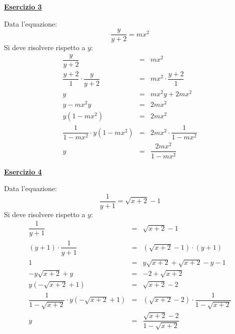 \documentclass[a4paper]{article}
\newcommand{\example}[1]{\textcolor{Green4}{\textbf{#1}}}
\begin{document}
	\begin{flushleft}
		\example{\underline{Esercizio 3}}
	\end{flushleft}

	\noindent
	Data l'equazione:
	\begin{equation*}
		\dfrac{y}{y+2} = mx^{2}
	\end{equation*}
	Si deve risolvere rispetto a $y$:
	\begin{equation*}
		\begin{array}{rcl}
			\dfrac{y}{y+2} &=& mx^{2} \\ [1em]
			\dfrac{y+2}{1} \cdot \dfrac{y}{y+2} &=& mx^{2} \cdot \dfrac{y+2}{1} \\ [1em]
			y &=& mx^{2}y + 2 m x^{2} \\ [1em]
			y - mx^{2}y &=& 2 m x^{2} \\ [1em]
			y\left(1 - mx^{2}\right) &=& 2 m x^{2} \\ [1em]
			\dfrac{1}{1 - mx^{2}} \cdot y\left(1 - mx^{2}\right) &=& 2 m x^{2} \cdot \dfrac{1}{1 - mx^{2}} \\ [1em]
			y &=& \dfrac{2 m x^{2}}{1 - mx^{2}}
		\end{array}
	\end{equation*}

	\begin{flushleft}
		\example{\underline{Esercizio 4}}
	\end{flushleft}

	\noindent
	Data l'equazione:
	\begin{equation*}
		\dfrac{1}{y+1} = \sqrt{x+2}-1
	\end{equation*}
	Si deve risolvere rispetto a $y$:
	\begin{equation*}
		\begin{array}{rcl}
			\dfrac{1}{y+1} &=& \sqrt{x+2}-1 \\ [1em]
			\left(y+1\right) \cdot \dfrac{1}{y+1} &=& \left(\sqrt{x+2}-1\right) \cdot \left(y+1\right) \\ [1em]
			1 &=& y\sqrt{x+2} + \sqrt{x+2} -y -1 \\ [1em]
			-y\sqrt{x+2} + y &=& -2 + \sqrt{x+2} \\ [1em]
			y\left(-\sqrt{x+2} + 1\right) &=& \sqrt{x+2} - 2 \\ [1em]
			\dfrac{1}{1 - \sqrt{x+2}} \cdot y\left(-\sqrt{x+2} + 1\right) &=& \left(\sqrt{x+2} - 2\right) \cdot \dfrac{1}{1 - \sqrt{x+2}} \\ [1em]
			y &=& \dfrac{\sqrt{x+2} -2}{1-\sqrt{x+2}}
		\end{array}
	\end{equation*}\newpage
\end{document}

